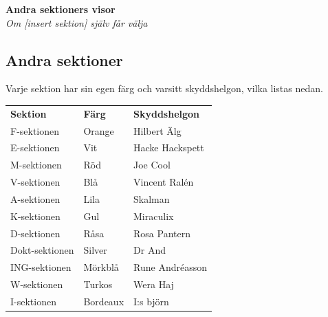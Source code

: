 \begin{center}
    \vspace*{1.5cm}
    {\fontsize{20}{20}\textbf{Andra sektioners visor}}\\
    \vspace{0.7cm}
    {\fontsize{12}{12}\textit{Om [insert sektion] själv får välja}}  
\end{center}
\newpage
\resetBackground

\noBackground
\subsection*{Andra sektioner}

Varje sektion har sin egen färg och varsitt skyddshelgon, vilka listas nedan.

\renewcommand{\arraystretch}{1.3}
\setlength{\tabcolsep}{10pt}

\begin{center}
\begin{tabular}{lll}
\textbf{Sektion} & \textbf{Färg} & \textbf{Skyddshelgon} \\

F-sektionen & Orange & Hilbert Älg \\
E-sektionen & Vit & Hacke Hackspett \\
M-sektionen & Röd & Joe Cool \\
V-sektionen & Blå & Vincent Ralén \\
A-sektionen & Lila & Skalman \\
K-sektionen & Gul & Miraculix \\
D-sektionen & Råsa & Rosa Pantern \\
Dokt-sektionen & Silver & Dr And \\
ING-sektionen & Mörkblå & Rune Andréasson \\
W-sektionen & Turkos & Wera Haj \\
I-sektionen & Bordeaux & I:s björn \\
\end{tabular}
\end{center}
\renewcommand{\arraystretch}{1.0}

